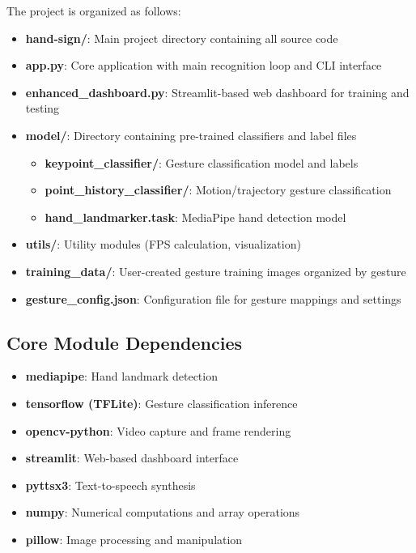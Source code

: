 The project is organized as follows:
\begin{itemize}
    \item \textbf{hand-sign/}: Main project directory containing all source code
    \item \textbf{app.py}: Core application with main recognition loop and CLI interface
    \item \textbf{enhanced\_dashboard.py}: Streamlit-based web dashboard for training and testing
    \item \textbf{model/}: Directory containing pre-trained classifiers and label files
    \begin{itemize}
        \item \textbf{keypoint\_classifier/}: Gesture classification model and labels
        \item \textbf{point\_history\_classifier/}: Motion/trajectory gesture classification
        \item \textbf{hand\_landmarker.task}: MediaPipe hand detection model
    \end{itemize}
    \item \textbf{utils/}: Utility modules (FPS calculation, visualization)
    \item \textbf{training\_data/}: User-created gesture training images organized by gesture
    \item \textbf{gesture\_config.json}: Configuration file for gesture mappings and settings
\end{itemize}

\subsection{Core Module Dependencies}

\begin{itemize}
    \item \textbf{mediapipe}: Hand landmark detection
    \item \textbf{tensorflow (TFLite)}: Gesture classification inference
    \item \textbf{opencv-python}: Video capture and frame rendering
    \item \textbf{streamlit}: Web-based dashboard interface
    \item \textbf{pyttsx3}: Text-to-speech synthesis
    \item \textbf{numpy}: Numerical computations and array operations
    \item \textbf{pillow}: Image processing and manipulation
\end{itemize}

